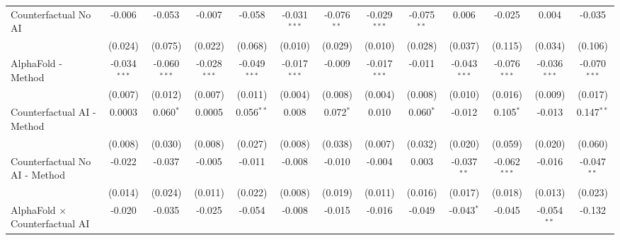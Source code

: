 \begin{tabular}{lcccccccccccc}
   Counterfactual No AI                                       & -0.006         & -0.053         & -0.007         & -0.058         & -0.031$^{***}$ & -0.076$^{**}$ & -0.029$^{***}$ & -0.075$^{**}$ & 0.006          & -0.025         & 0.004          & -0.035\\   
                                                              & (0.024)        & (0.075)        & (0.022)        & (0.068)        & (0.010)        & (0.029)       & (0.010)        & (0.028)       & (0.037)        & (0.115)        & (0.034)        & (0.106)\\   
   AlphaFold - Method                                         & -0.034$^{***}$ & -0.060$^{***}$ & -0.028$^{***}$ & -0.049$^{***}$ & -0.017$^{***}$ & -0.009        & -0.017$^{***}$ & -0.011        & -0.043$^{***}$ & -0.076$^{***}$ & -0.036$^{***}$ & -0.070$^{***}$\\   
                                                              & (0.007)        & (0.012)        & (0.007)        & (0.011)        & (0.004)        & (0.008)       & (0.004)        & (0.008)       & (0.010)        & (0.016)        & (0.009)        & (0.017)\\   
   Counterfactual AI - Method                                 & 0.0003         & 0.060$^{*}$    & 0.0005         & 0.056$^{**}$   & 0.008          & 0.072$^{*}$   & 0.010          & 0.060$^{*}$   & -0.012         & 0.105$^{*}$    & -0.013         & 0.147$^{**}$\\   
                                                              & (0.008)        & (0.030)        & (0.008)        & (0.027)        & (0.008)        & (0.038)       & (0.007)        & (0.032)       & (0.020)        & (0.059)        & (0.020)        & (0.060)\\   
   Counterfactual No AI - Method                              & -0.022         & -0.037         & -0.005         & -0.011         & -0.008         & -0.010        & -0.004         & 0.003         & -0.037$^{**}$  & -0.062$^{***}$ & -0.016         & -0.047$^{**}$\\   
                                                              & (0.014)        & (0.024)        & (0.011)        & (0.022)        & (0.008)        & (0.019)       & (0.011)        & (0.016)       & (0.017)        & (0.018)        & (0.013)        & (0.023)\\   
   AlphaFold $\times$ Counterfactual AI                       & -0.020         & -0.035         & -0.025         & -0.054         & -0.008         & -0.015        & -0.016         & -0.049        & -0.043$^{*}$   & -0.045         & -0.054$^{**}$  & -0.132\\   

\end{tabular}
